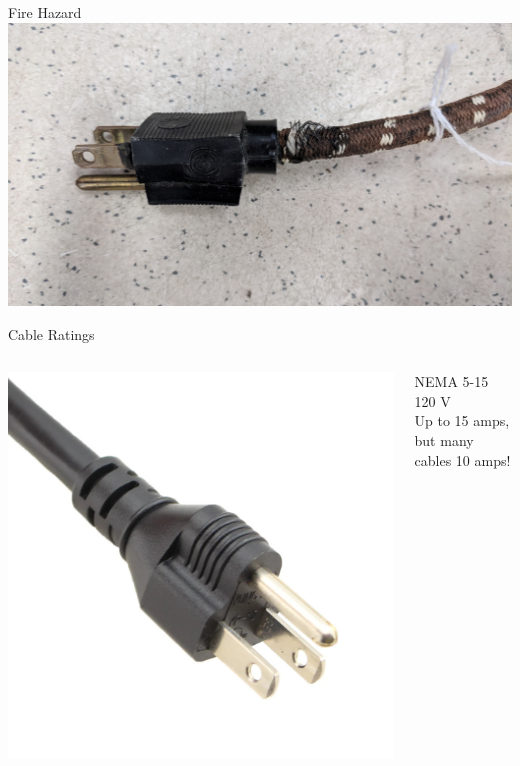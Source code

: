 \documentclass{presentation}
\begin{document}
\begin{frame}{Fire Hazard}
  \includegraphics[width=\textwidth]{"./IMG_20181009_153609.jpg"}
\end{frame}

\begin{frame}{Cable Ratings}
  \begin{columns}
    \begin{column}{0.33\textwidth}
      \includegraphics[width=\textwidth]{"./5-15.jpg"}
    \end{column}
    \begin{column}{0.67\textwidth}
      NEMA 5-15
      \\
      120 V
      \\
      Up to 15 amps, but many cables 10 amps!
    \end{column}
  \end{columns}
\end{frame}
\end{document}
